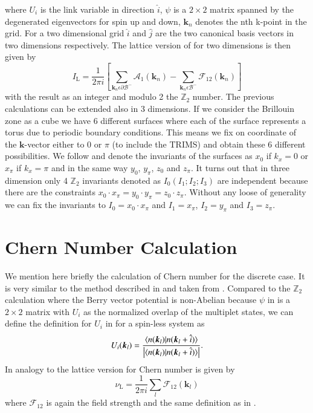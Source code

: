 \documentclass[a4paper,11pt]{report}
\begin{document}
where $U_i$ is the link variable in direction $\hat{i}$, $\psi$ is a $2\times2$ matrix spanned by the degenerated eigenvectors for spin up and down,
$\bm{k}_n$ denotes the nth k-point in the grid. For a two dimensional grid $\hat{i}$ and $\hat{j}$ are the two canonical basis vectors in two dimensions
respectively. The lattice version of  for two dimensions is then given by
\begin{equation}
 I_{\mathrm{L}} = \frac{1}{2\pi i}\left[\sum_{\bm{k}_n \epsilon \partial \mathcal{B}^{-}}\mathcal{A}_1(\bm{k}_n) 
 - \sum_{\bm{k}_n \epsilon \mathcal{B}^{-}} \mathcal{F}_{12}(\bm{k}_n)\right] 
\end{equation}
with the result as an integer and modulo 2 the $\mathds{Z}_2$ number. The previous calculations can be extended also in 3 dimensions. If we consider
the Brillouin zone as a cube we have 6 different surfaces where each of the surface represents a torus due to periodic boundary conditions. This means
we fix on coordinate of the $\bm{k}$-vector either to 0 or $\pi$ (to include the TRIMS) and obtain these 6 different possibilities. 
We follow \cite{Fukui2007} and denote the invariants of the surfaces
as $x_0$ if $k_x = 0$ or $x_\pi$ if $k_x = \pi$ and in the same way $y_0$, $y_\pi$, $z_0$ and $z_\pi$. It turns out that in three dimension only 4 
$\mathds{Z}_2$ invariants denoted as $I_0(I_1;I_2;I_3)$ are independent because there are the constraints $x_0\cdot x_\pi = y_0\cdot y_\pi = z_0\cdot z_\pi$.
Without any loose of generality we can fix the invariants to $I_0 = x_0\cdot x_\pi$ and $I_1 = x_\pi$, $I_2 = y_\pi$ and $I_3 = z_\pi$.

\section{Chern Number Calculation}

We mention here briefly the calculation of Chern number for the discrete case. It is very similar to the method described in  and taken from
\cite{Fukui2008}. Compared to the $\mathds{Z}_2$ calculation where the Berry vector potential is non-Abelian because $\psi$ in  is a $2\times 2$
matrix with $U_i$ as the normalized overlap of the multiplet states, we can define the definition for $U_i$ in  for a spin-less system as
\begin{equation}
  U_i(\bm{k}_l) = \frac{\braket{n(\bm{k}_l)|n(\bm{k}_l + \hat{i})}}{\left|\braket{n(\bm{k}_l)|n(\bm{k}_l + \hat{i})}\right|}.
\end{equation}
In analogy to  the lattice version for Chern number is given by
\begin{equation}
 \nu_{\mathrm{L}} = \frac{1}{2\pi i}\sum_l\mathcal{F}_{12}(\bm{k}_l)
\end{equation}
where $\mathcal{F}_{12}$ is again the field strength and the same definition as in .
\end{document}

